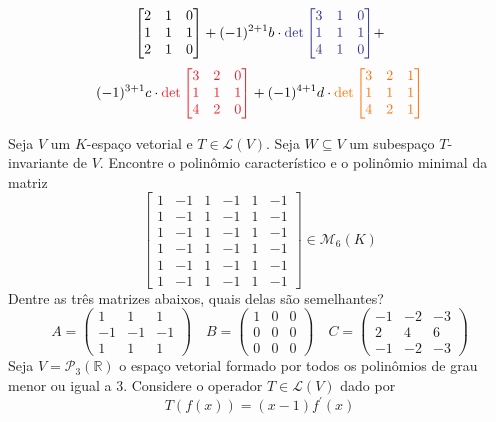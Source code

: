 \documentclass[11pt,a4paper]{article}
\begin{document}
{\[{\begin{bmatrix}
2 & 1 & 0\\
1 & 1 & 1\\
2 & 1 & 0
\end{bmatrix}} + (-1)^{2+1} b \cdot \textcolor{Blue}{\det
\begin{bmatrix}
3  & 1 & 0\\
1  & 1 & 1\\
4  & 1 & 0
\end{bmatrix}} + \]\[(-1)^{3+1} c \cdot \textcolor{Red}{\det \begin{bmatrix}
3 & 2 & 0\\
1 & 1 & 1\\
4 & 2 & 0
\end{bmatrix}} + (-1)^{4+1} d \cdot \textcolor{Laranja}{\det \begin{bmatrix}
3 & 2 & 1 \\
1 & 1 & 1 \\
4 & 2 & 1 \\
\end{bmatrix}}
\]
}

 Seja $V$ um $K$-espaço vetorial e $T \in \mathcal{L}(V).$ Seja $W \subseteq V$ um subespaço $T$-invariante de $V.$
\solucao{}
 Encontre o polinômio característico e o polinômio minimal da matriz
\[
\begin{bmatrix}
1 & -1 & 1 & -1 & 1 & -1 \\
1 & -1 & 1 & -1 & 1 & -1 \\
1 & -1 & 1 & -1 & 1 & -1 \\
1 & -1 & 1 & -1 & 1 & -1 \\
1 & -1 & 1 & -1 & 1 & -1 \\
1 & -1 & 1 & -1 & 1 & -1
\end{bmatrix} \in \mathcal{M}_6(K)
\]
\solucao{}
 Dentre as três matrizes abaixos, quais delas são semelhantes?
\[
A = \begin{pmatrix}
1 & 1 & 1 \\
-1& -1 & -1 \\
1 & 1 & 1
\end{pmatrix}  \quad B = \begin{pmatrix}
1 & 0 & 0 \\
0& 0 & 0 \\
0 & 0 &0
\end{pmatrix} \quad C = \begin{pmatrix}
-1 & -2 & -3 \\
2& 4 & 6 \\
-1& -2 &-3
\end{pmatrix}
\]
\solucao{}
 Seja $V = \mathcal{P}_3(\mathbb{R})$ o espaço vetorial formado por todos os polinômios de grau menor ou igual a $3.$ Considere o operador $T \in \mathcal{L}(V)$ dado por
\[
T(f(x)) = (x-1) f^{\prime}(x)
\]
 
\end{document}
